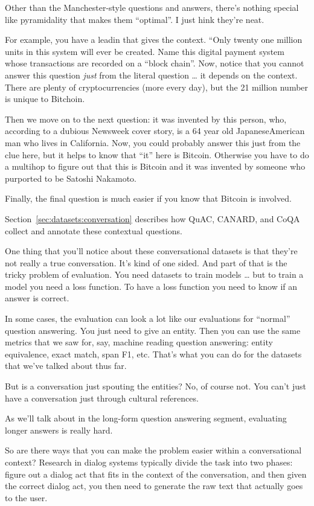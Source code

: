 Other than the Manchester-style questions and answers, there’s nothing special like pyramidality that makes them “optimal”.  I just hink they’re neat.

For example, you have a leadin that gives the context.  “Only twenty­ one million units in this system will ever be created. Name this digital payment system whose transactions are recorded on a “block chain”. Now, notice that you cannot answer this question \emph{just} from the literal question … it depends on the context.  There are plenty of cryptocurrencies (more every day), but the 21 million number is unique to Bitchoin.

Then we move on to the next question: it was invented by this person, who, according to a dubious Newsweek cover story, is a 64­ year ­old Japanese­American man who lives in California.  Now, you could probably answer this just from the clue here, but it helps to know that “it” here is Bitcoin.  Otherwise you have to do a multihop to figure out that this is Bitcoin and it was invented by someone who purported to be Satoshi Nakamoto.

Finally, the final question is much easier if you know that Bitcoin is involved.

Section~\ref{sec:datasets:conversation} describes how QuAC, CANARD, and CoQA collect and annotate these contextual questions.

One thing that you’ll notice about these conversational datasets is that they’re not really a true conversation.  It’s kind of one sided.  And part of that is the tricky problem of evaluation.  You need datasets to train models … but to train a model you need a loss function.  To have a loss function you need to know if an answer is correct.  

In some cases, the evaluation can look a lot like our evaluations for “normal” question answering.  You just need to give an entity.  Then you can use the same metrics that we saw for, say, machine reading question answering: entity equivalence, exact match, span F1, etc.  That’s what you can do for the datasets that we’ve talked about thus far.

But is a conversation just spouting the entities?  No, of course not.  You can’t just have a conversation just through cultural references.  

As we’ll talk about in the long-form question answering segment, evaluating longer answers is really hard.  

So are there ways that you can make the problem easier within a conversational context?  Research in dialog systems typically divide the task into two phases: figure out a dialog act that fits in the context of the conversation, and then given the correct dialog act, you then need to generate the raw text that actually goes to the user. 

